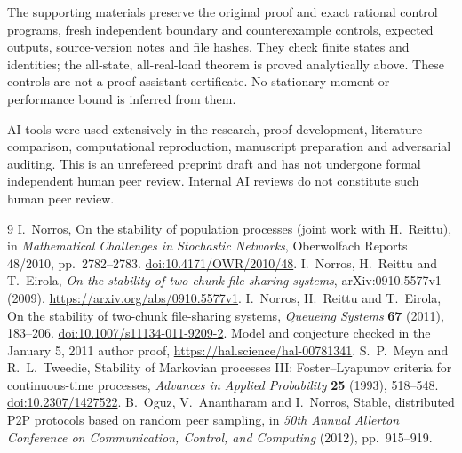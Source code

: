 \documentclass[11pt]{article}
\begin{document}
The supporting materials preserve the original proof and exact
rational control programs, fresh independent boundary and
counterexample controls, expected outputs, source-version notes and
file hashes. They check finite states and identities; the all-state,
all-real-load theorem is proved analytically above. These controls
are not a proof-assistant certificate. No stationary moment or
performance bound is inferred from them.

AI tools were used extensively in the research, proof development,
literature comparison, computational reproduction, manuscript
preparation and adversarial auditing. This is an unrefereed preprint
draft and has not undergone formal independent human peer review.
Internal AI reviews do not constitute such human peer review.

\begin{thebibliography}{9}
I.~Norros, On the stability of population processes
(joint work with H.~Reittu), in \emph{Mathematical Challenges in
Stochastic Networks}, Oberwolfach Reports 48/2010, pp.~2782--2783.
\href{https://doi.org/10.4171/OWR/2010/48}{doi:10.4171/OWR/2010/48}.
I.~Norros, H.~Reittu and T.~Eirola,
\emph{On the stability of two-chunk file-sharing systems},
arXiv:0910.5577v1 (2009).
\url{https://arxiv.org/abs/0910.5577v1}.
I.~Norros, H.~Reittu and T.~Eirola,
On the stability of two-chunk file-sharing systems,
\emph{Queueing Systems} \textbf{67} (2011), 183--206.
\href{https://doi.org/10.1007/s11134-011-9209-2}
{doi:10.1007/s11134-011-9209-2}.
Model and conjecture checked in the January 5, 2011 author proof,
\url{https://hal.science/hal-00781341}.
S.~P.~Meyn and R.~L.~Tweedie,
Stability of Markovian processes III: Foster--Lyapunov criteria for
continuous-time processes,
\emph{Advances in Applied Probability} \textbf{25} (1993), 518--548.
\href{https://doi.org/10.2307/1427522}{doi:10.2307/1427522}.
B.~Oguz, V.~Anantharam and I.~Norros,
Stable, distributed P2P protocols based on random peer sampling,
in \emph{50th Annual Allerton Conference on Communication, Control,
and Computing} (2012), pp.~915--919.
\end{thebibliography}
\end{document}
